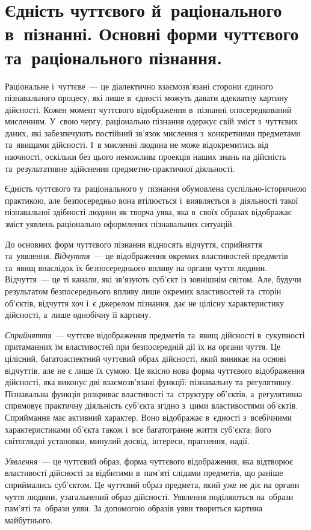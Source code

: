 \documentclass[a5paper,oneside,DIV=12,12pt,headings=small]{scrartcl}
\begin{document}
	\section{Єдність чуттєвого й~раціонального в~пізнанні. Основні форми чуттєвого та~раціонального пізнання.}
		Раціональне і~чуттєве~— це діалектично взаємозв'язані сторони єдиного пізнавального процесу, які лише в~єдності можуть давати адекватну картину дійсності. Кожен момент чуттєвого відображення в~пізнанні опосередкований мисленням. У~свою чергу, раціонально пізнання одержує свій зміст з~чуттєвих даних, які забезпечують постійний зв'язок мислення з~конкретними предметами та~явищами дійсності. І~в мисленні людина не може відокремитись від наочності, оскільки без цього неможлива проекція наших знань на дійсність та~результативне здійснення предметно-практичної діяльності.

		Єдність чуттєвого та~раціонального у~пізнання обумовлена суспільно-історичною практикою, але безпосередньо вона втілюється і~виявляється в~діяльності такої пізнавальної здібності людини як творча уява, яка в~своїх образах відображає зміст уявлень раціонально оформлених пізнавальних ситуацій. 

		До основних форм чуттєвого пізнання відносять відчуття, сприйняття та~уявлення. \emph{Відчуття}~— це відображення окремих властивостей предметів та~явищ внаслідок їх безпосереднього впливу на органи чуття людини. Відчуття~— це ті канали, які зв'язують суб'\-єкт із зовнішнім світом. Але, будучи результатом безпосереднього впливу лише окремих властивостей та~сторін об'\-єк\-тів, відчуття хоч і~є джерелом пізнання, дає не цілісну характеристику дійсності, а~лише однобічну її картину.

		\emph{Сприйняття}~— чуттєве відображення предметів та~явищ дійсності в~сукупності притаманних їм властивостей при безпосередній дії їх на органи чуття. Це цілісний, багатоаспектний чуттєвий обрах дійсності, який виникає на основі відчуттів, але не є лише їх сумою. Це якісно нова форма чуттєвого відображення дійсності, яка виконує дві взаємозв'язані функції: пізнавальну та~регулятивну. Пізнавальна функція розкриває властивості та~структуру об'\-єк\-тів, а~регулятивна спрямовує практичну діяльність суб'\-єкта згідно з~цими властивостями об'\-єк\-тів. Сприймання має активний характер. Воно відображає в~єдності з~всебічними характеристиками об'\-єк\-та також і~все багатогранне життя суб'\-єкта: його світоглядні установки, минулий досвід, інтереси, прагнення, надії.

		\emph{Уявлення}~— це чуттєвий образ, форма чуттєвого відображення, яка відтворює властивості дійсності за відбитими в~пам'\-я\-ті слідами предметів, що раніше сприймались суб'\-єк\-том. Це чуттєвий образ предмета, який уже не діє на органи чуття людини, узагальнений образ дійсності. Уявлення поділяються на~образи пам'\-я\-ті та~образи уяви. За допомогою образів уяви твориться картина майбутнього.
\end{document}
